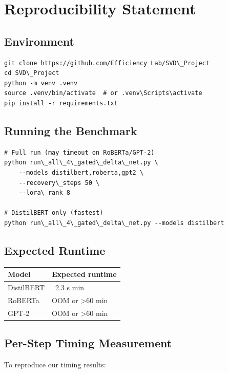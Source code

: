 
\section{Reproducibility Statement}

\subsection{Environment}

\begin{lstlisting}
git clone https://github.com/Efficiency Lab/SVD\_Project
cd SVD\_Project
python -m venv .venv
source .venv/bin/activate  # or .venv\Scripts\activate
pip install -r requirements.txt
\end{lstlisting}

\subsection{Running the Benchmark}

\begin{lstlisting}
# Full run (may timeout on RoBERTa/GPT-2)
python run\_all\_4\_gated\_delta\_net.py \
    --models distilbert,roberta,gpt2 \
    --recovery\_steps 50 \
    --lora\_rank 8

# DistilBERT only (fastest)
python run\_all\_4\_gated\_delta\_net.py --models distilbert
\end{lstlisting}

\subsection{Expected Runtime}

\begin{table}[H]
\centering
\small
\begin{tabular}{ll}
\toprule
\textbf{Model} & \textbf{Expected runtime} \\
\midrule
DistilBERT & ~2.3 s min \\
RoBERTa & OOM or \textgreater{}60 min \\
GPT-2 & OOM or \textgreater{}60 min \\
\bottomrule
\end{tabular}
\end{table}

\subsection{Per-Step Timing Measurement}

To reproduce our timing results:

